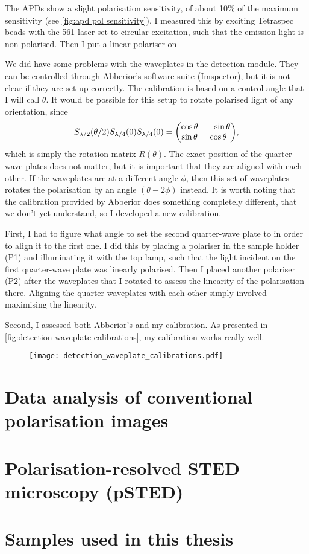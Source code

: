 The APDs show a slight polarisation sensitivity, of about 10\% of the maximum sensitivity (see \autoref{fig:apd pol sensitivity}). I measured this by exciting Tetraspec beads with the 561 laser set to circular excitation, such that the emission light is non-polarised. Then I put a linear polariser on  

We did have some problems with the waveplates in the detection module. They can be controlled through Abberior's software suite (Imspector), but it is not clear if they are set up correctly. The calibration is based on a control angle that I will call $ \theta $. It would be possible for this setup to rotate polarised light of any orientation, since
\begin{equation}
	S_\hwp(\theta/2) S_\qwp(0) S_\qwp(0) = \mqty(\cos\theta & -\sin\theta \\ \sin\theta & \cos\theta ),
\end{equation}
which is simply the rotation matrix $ R(\theta) $. The exact position of the quarter-wave plates does not matter, but it is important that they are aligned with each other. If the waveplates are at a different angle $ \phi $, then this set of waveplates rotates the polarisation by an angle $ (\theta-2\phi) $ instead. It is worth noting that the calibration provided by Abberior does something completely different, that we don't yet understand, so I developed a new calibration.

First, I had to figure what angle to set the second quarter-wave plate to in order to align it to the first one. I did this by placing a polariser in the sample holder (P1) and illuminating it with the top lamp, such that the light incident on the first quarter-wave plate was linearly polarised. Then I placed another polariser (P2) after the waveplates that I rotated to assess the linearity of the polarisation there. Aligning the quarter-waveplates with each other simply involved maximising the linearity. 

Second, I assessed both Abberior's and my calibration. As presented in \autoref{fig:detection waveplate calibrations}, my calibration works really well. 

\begin{figure}
	\centering
	\texttt{[image: detection\_waveplate\_calibrations.pdf]}
	\caption{}
	\label{fig:detection waveplate calibrations}
\end{figure}


\section{Data analysis of conventional polarisation images}

\section{Polarisation-resolved STED microscopy (pSTED)}

\section{Samples used in this thesis}
